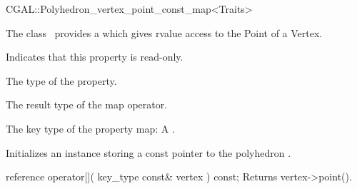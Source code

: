 

\begin{ccRefClass}{CGAL::Polyhedron_vertex_point_const_map<Traits>}


\ccDefinition

The class \ccRefName\ provides a   which gives rvalue access to the Point of a  Vertex.


\ccTypes
    {Indicates that this property is read-only.}
  
    {The type of the property.}
    
    {The result type of the map operator.}
    
  {The key type of the property map: A .}

\ccCreation
{}  %

{Initializes an instance storing a const pointer to the polyhedron .}

\ccOperations

\ccMethod
  {reference operator[]( key_type const& vertex ) const;}
  {Returns vertex->point().}  
    
\ccIsModel
{}

\end{ccRefClass}


